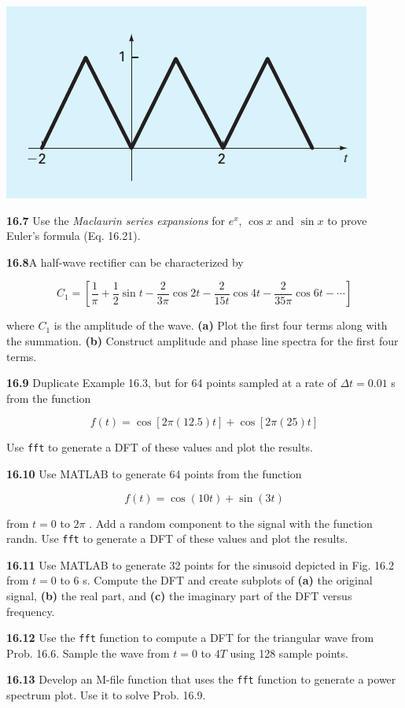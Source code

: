 \documentclass[../main.tex]{subfiles}
\begin{document}
\begin{multicols}{2}
	\noindent
    \begin{minipage}{\linewidth}
        \centering
        \includegraphics[width=0.8\linewidth]{./images/problem_16_6}
    \end{minipage}

	\noindent\textbf{16.7} Use the \textit{Maclaurin series expansions} for $e^x$, $\cos x$ and
	$\sin x$ to prove Euler's formula (Eq. 16.21).

	\noindent\textbf{16.8}A half-wave rectifier can be characterized by

	$$
		C_1 = [\frac{1}{\pi} + \frac{1}{2} \sin t 	- \frac{2}{3 \pi} \cos 2t - \frac{2}{15t} \cos 4t - \frac{2}{35 \pi} \cos 6t - \cdots]
	$$

	\noindent where $C_1$ is the amplitude of the wave.
	\textbf{(a)} Plot the first four terms along with the summation.
	\textbf{(b)} Construct amplitude and phase line spectra for the first
	four terms.

	\noindent\textbf{16.9} Duplicate Example 16.3, but for 64 points sampled at a
	rate of $\Delta t = 0.01$ s from the function

	$$
		f (t) = \cos[2 \pi (12.5)t] + \cos[2 \pi (25)t]
	$$

	\noindent Use \texttt{fft} to generate a DFT of these values and plot the
	results.

	\noindent\textbf{16.10}  Use MATLAB to generate 64 points from the function

	$$
	f (t) = \cos(10t) + \sin(3t)
	$$

	\noindent from $t = 0$ to $2 \pi$ . Add a random component to the signal with
	the function randn. Use \texttt{fft} to generate a DFT of these
	values and plot the results.

	\noindent\textbf{16.11}  Use MATLAB to generate 32 points for the sinusoid
	depicted in Fig. 16.2 from $t = 0$ to 6 s. Compute the DFT
	and create subplots of \textbf{(a)} the original signal, \textbf{(b)} the real
	part, and \textbf{(c)} the imaginary part of the DFT versus frequency.

	\noindent\textbf{16.12} Use the \texttt{fft} function to compute a DFT for the triangular wave from Prob. 16.6. Sample the wave from $t = 0$
	to $4T$ using 128 sample points.

	\noindent\textbf{16.13}  Develop an M-file function that uses the \texttt{fft} function to generate a power spectrum plot. Use it to solve
	Prob. 16.9.
\end{multicols}
\end{document}
